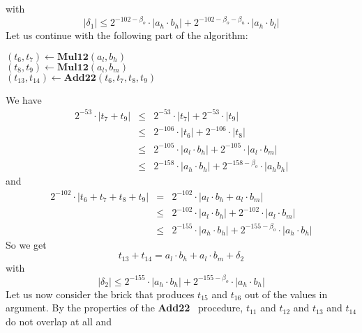 \documentclass[a4paper,10pt,twoside]{article}
\newenvironment{proof}[1][Proof]{\begin{trivlist}
\item[\hskip \labelsep {\bfseries #1}]}{\end{trivlist}}
\newcommand{\hi}{\ensuremath{\mathit{h}}}
\newcommand{\mi}{\ensuremath{\mathit{m}}}
\newcommand{\lo}{\ensuremath{\mathit{l}}}
\newcommand{\AddDD}{{\bf Add22}}
\newcommand{\mAddDD}{\ensuremath{\mathbf{Add22}}}
\newcommand{\mMul}{\ensuremath{\mathbf{Mul12}}}
\begin{document}
\begin{proof}
with
$$\left \vert \delta_1 \right \vert \leq 
2^{-102-\beta_o} \cdot \left \vert a_\hi \cdot b_\hi \right \vert + 2^{-102-\beta_o-\beta_u} \cdot \left \vert a_\hi \cdot b_\lo \right \vert$$
Let us continue with the following part of the algorithm:
\begin{center}
\begin{minipage}[b]{60mm}
$\left( t_6, t_7 \right) \gets \mMul\left( a_\lo, b_\hi \right)$ \\
$\left( t_8, t_9 \right) \gets \mMul\left( a_\lo, b_\mi \right)$ \\
$\left( t_{13}, t_{14} \right) \gets \mAddDD\left( t_6, t_7, t_8, t_9 \right)$ 
\end{minipage}
\end{center}
We have
\begin{eqnarray*}
2^{-53} \cdot \left \vert t_7 + t_9 \right \vert & \leq & 2^{-53} \cdot \left \vert t_7 \right \vert + 2^{-53} \cdot \left \vert t_9 \right \vert \\
& \leq & 2^{-106} \cdot \left \vert t_6 \right \vert + 2^{-106} \cdot \left \vert t_8 \right \vert \\
& \leq & 2^{-105} \cdot \left \vert a_\lo \cdot b_\hi \right \vert + 2^{-105} \cdot \left \vert a_\lo \cdot b_\mi \right \vert \\
& \leq & 2^{-158} \cdot \left \vert a_\hi \cdot b_\hi \right \vert + 2^{-158-\beta_o} \cdot \left \vert a_\hi b_\hi \right \vert 
\end{eqnarray*}
and
\begin{eqnarray*}
2^{-102} \cdot \left \vert t_6 + t_7 + t_8 + t_9 \right \vert & = &  2^{-102} \cdot \left \vert a_\lo \cdot b_\hi + a_\lo \cdot b_\mi \right \vert \\
& \leq & 2^{-102} \cdot \left \vert a_\lo \cdot b_\hi \right \vert + 2^{-102} \cdot \left \vert a_\lo \cdot b_\mi \right \vert \\
& \leq & 2^{-155} \cdot \left \vert a_\hi \cdot b_\hi \right \vert + 2^{-155-\beta_o} \cdot \left \vert a_\hi \cdot b_\hi \right \vert
\end{eqnarray*}
So we get
$$t_{13} + t_{14} = a_\lo \cdot b_\hi + a_\lo \cdot b_\mi + \delta_2$$
with
$$\left \vert \delta_2 \right \vert \leq 
2^{-155} \cdot \left \vert a_\hi \cdot b_\hi \right \vert + 2^{-155-\beta_o} \cdot \left \vert a_\hi \cdot b_\hi \right \vert$$
Let us now consider the brick that produces $t_{15}$ and $t_{16}$ out of the values in argument.
By the properties of the \AddDD~ procedure, $t_{11}$ and $t_{12}$ and $t_{13}$ and $t_{14}$ do not overlap at all and

\end{proof}
\end{document}
